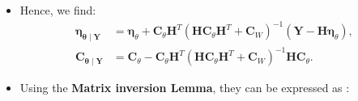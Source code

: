 \begin{itemize}
\begin{align*}
   \exp\!\left(
     -\frac{1}{2}
     (\boldsymbol{\theta}-\boldsymbol{\eta}_{\boldsymbol{\theta}\mid\mathbf{Y}})^{T}
     \mathbf{C}_{\boldsymbol{\theta}\mid\mathbf{Y}}^{-1}
     (\boldsymbol{\theta}-\boldsymbol{\eta}_{\boldsymbol{\theta}\mid\mathbf{Y}})
   \right), \\[10pt]
\boldsymbol{\eta}_{\boldsymbol{\theta}\mid\mathbf{Y}}
&= E\{\boldsymbol{\theta}\mid\mathbf{Y}\}
 = \boldsymbol{\eta}_\theta
   + \mathbf{C}_{\boldsymbol{\theta}\mathbf{Y}}\mathbf{C}_Y^{-1}
     (\mathbf{Y}-\boldsymbol{\eta}_Y), \\[6pt]
\mathbf{C}_{\boldsymbol{\theta}\mid\mathbf{Y}}
&= E\!\left\{
   (\boldsymbol{\theta}-\boldsymbol{\eta}_{\boldsymbol{\theta}\mid\mathbf{Y}})
   (\boldsymbol{\theta}-\boldsymbol{\eta}_{\boldsymbol{\theta}\mid\mathbf{Y}})^{T}
   \mid \mathbf{Y}
  \right\} \\[2pt]
&= \mathbf{C}_\theta
   - \mathbf{C}_{\boldsymbol{\theta}\mathbf{Y}}
     \mathbf{C}_Y^{-1}
     \mathbf{C}_{\mathbf{Y}\boldsymbol{\theta}}, \\[8pt]
\text{where}\quad
\boldsymbol{\eta}_Y &= \mathbf{H}\boldsymbol{\eta}_\theta,
\qquad
\mathbf{C}_Y = \mathbf{H}\mathbf{C}_\theta\mathbf{H}^{T} + \mathbf{C}_W, \\[4pt]
\mathbf{C}_{\boldsymbol{\theta}\mathbf{Y}}
&= (\mathbf{C}_{\mathbf{Y}\boldsymbol{\theta}})^{T}
 = E\{(\boldsymbol{\theta}-\boldsymbol{\eta}_\theta)
      (\mathbf{Y}-\boldsymbol{\eta}_Y)^{T}\} \\[2pt]
&= E\{(\boldsymbol{\theta}-\boldsymbol{\eta}_\theta)
      (\mathbf{H}(\boldsymbol{\theta}-\boldsymbol{\eta}_\theta)+\mathbf{W})^{T}\} \\[2pt]
&= E\{(\boldsymbol{\theta}-\boldsymbol{\eta}_\theta)
      (\boldsymbol{\theta}-\boldsymbol{\eta}_\theta)^{T}\mathbf{H}^{T}\}
 = \mathbf{C}_\theta\mathbf{H}^{T}.
\end{align*}

\item Hence, we find:
\begin{align*}
\boldsymbol{\eta}_{\boldsymbol{\theta}\mid\mathbf{Y}}
&= \boldsymbol{\eta}_\theta
   + \mathbf{C}_\theta\mathbf{H}^{T}
     \left(\mathbf{H}\mathbf{C}_\theta\mathbf{H}^{T}
           + \mathbf{C}_W\right)^{-1}
     (\mathbf{Y}-\mathbf{H}\boldsymbol{\eta}_\theta), \\[10pt]
\mathbf{C}_{\boldsymbol{\theta}\mid\mathbf{Y}}
&= \mathbf{C}_\theta
   - \mathbf{C}_\theta\mathbf{H}^{T}
     \left(\mathbf{H}\mathbf{C}_\theta\mathbf{H}^{T}
           + \mathbf{C}_W\right)^{-1}
     \mathbf{H}\mathbf{C}_\theta.
\end{align*}
\item Using the \textbf{Matrix inversion Lemma}, they can be expressed as :


\end{itemize}
